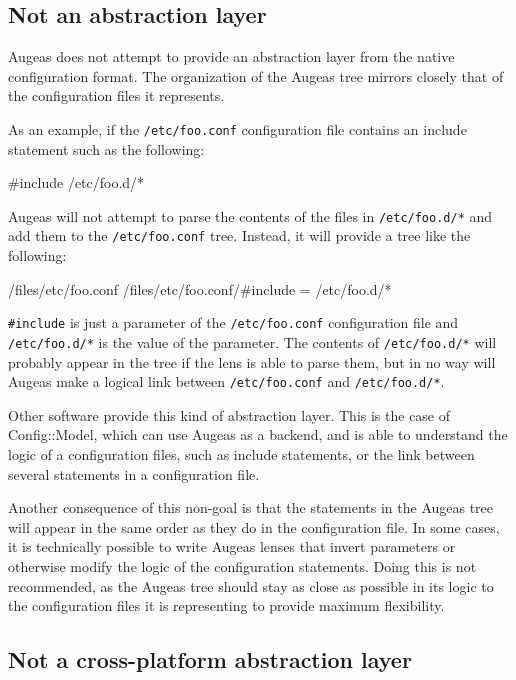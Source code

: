 \subsection{Not an abstraction layer}

Augeas does not attempt to provide an abstraction layer from the native configuration format. The organization of the Augeas tree mirrors closely that of the configuration files it represents.

As an example, if the \nolinkurl{/etc/foo.conf} configuration file contains an include statement such as the following:

\begin{bash}
#include /etc/foo.d/*
\end{bash}

Augeas will not attempt to parse the contents of the files in \nolinkurl{/etc/foo.d/*} and add them to the \nolinkurl{/etc/foo.conf} tree. Instead, it will provide a tree like the following:

\begin{augtoolsh}
/files/etc/foo.conf
/files/etc/foo.conf/#include = /etc/foo.d/*
\end{augtoolsh}

\verb!#include! is just a parameter of the \nolinkurl{/etc/foo.conf} configuration file and \nolinkurl{/etc/foo.d/*} is the value of the parameter. The contents of \nolinkurl{/etc/foo.d/*} will probably appear in the tree if the lens is able to parse them, but in no way will Augeas make a logical link between \nolinkurl{/etc/foo.conf} and \nolinkurl{/etc/foo.d/*}.

Other software provide this kind of abstraction layer. This is the case of Config::Model, which can use Augeas as a backend, and is able to understand the logic of a configuration files, such as include statements, or the link between several statements in a configuration file.

Another consequence of this non-goal is that the statements in the Augeas tree will appear in the same order as they do in the configuration file. In some cases, it is technically possible to write Augeas lenses that invert parameters or otherwise modify the logic of the configuration statements. Doing this is not recommended, as the Augeas tree should stay as close as possible in its logic to the configuration files it is representing to provide maximum flexibility.

\subsection{Not a cross-platform abstraction layer}


